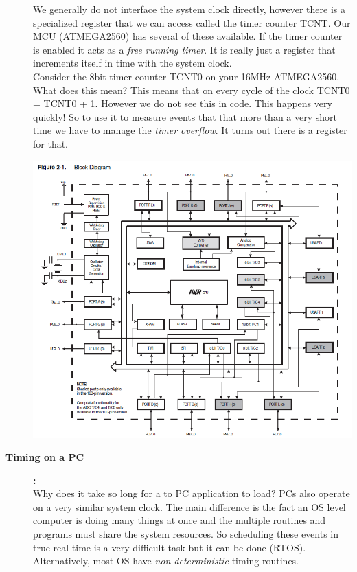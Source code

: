 \documentclass[11pt]{article}
\begin{document}
\begin{description}
			We generally do not interface the system clock directly, however there is a specialized register that we can access called the timer counter TCNT. Our MCU (ATMEGA2560) has several of these available. If the timer counter is enabled it acts as a {\it free running timer}. It is really just a register that increments itself in time with the system clock.\\
			
			Consider the 8bit timer counter TCNT0 on your 16MHz ATMEGA2560. What does this mean? This means that on every cycle of the clock TCNT0 = TCNT0 + 1. However we do not see this in code. This happens very quickly! So to use it to measure events that that more than a very short time we have to manage the {\it timer overflow}. It turns out there is a register for that.
			
			
            \includegraphics[scale=.75]{timer_fig1.png}
			
			
        \item[\textbf{Timing on a PC}]\textbf{:}\\  
		
		Why does it take so long for a to PC application to load? PCs also operate on a very similar system clock. The main difference is the fact an OS level computer is doing many things at once and the multiple routines and programs must share the system resources. So scheduling these events in true real time is a very difficult task but it can be done (RTOS). Alternatively, most OS have {\it non-deterministic} timing routines. 


\end{description}
\end{document}

